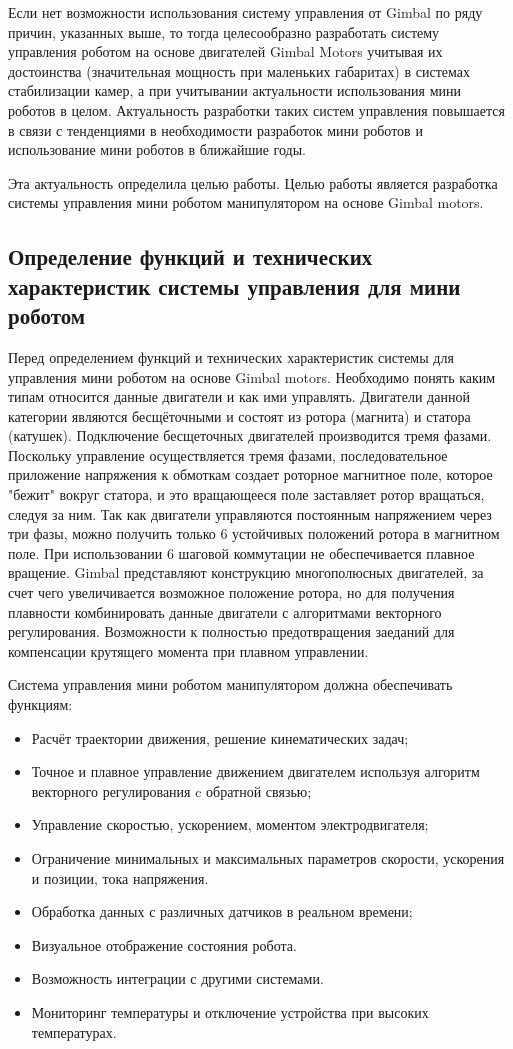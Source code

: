 Если нет возможности использования систему управления от Gimbal по ряду причин, указанных выше, то тогда целесообразно разработать систему управления роботом на основе двигателей Gimbal Motors учитывая их достоинства (значительная мощность при маленьких габаритах) в системах стабилизации камер, а при учитывании актуальности использования мини роботов в целом. Актуальность разработки таких систем управления повышается в связи с тенденциями в необходимости разработок мини роботов и использование мини роботов в ближайшие годы.

Эта актуальность определила целью работы. Целью работы является разработка системы управления мини роботом манипулятором на основе Gimbal motors.

\subsection{Определение функций и технических характеристик системы управления для мини роботом}

Перед определением функций и технических характеристик системы для управления мини роботом на основе Gimbal motors. Необходимо понять каким типам относится данные двигатели и как ими управлять.  Двигатели данной категории являются бесщёточными и состоят из ротора (магнита) и статора (катушек). Подключение бесщеточных двигателей производится тремя фазами. Поскольку управление осуществляется тремя фазами, последовательное приложение напряжения к обмоткам создает роторное магнитное поле, которое "бежит" вокруг статора, и это вращающееся поле заставляет ротор вращаться, следуя за ним.  Так как двигатели управляются постоянным напряжением через три фазы, можно получить только 6 устойчивых положений ротора в магнитном поле. При использовании 6 шаговой коммутации не обеспечивается плавное вращение. Gimbal представляют конструкцию многополюсных двигателей, за счет чего увеличивается возможное положение ротора, но для получения плавности комбинировать данные двигатели с алгоритмами векторного регулирования. Возможности к полностью предотвращения заеданий для компенсации крутящего момента при плавном управлении.

Система управления мини роботом манипулятором должна обеспечивать функциям:
\begin{itemize}
	\item Расчёт траектории движения, решение кинематических задач;
	\item Точное и плавное управление движением двигателем используя алгоритм векторного регулирования c обратной связью;
	\item Управление скоростью, ускорением, моментом электродвигателя;
	\item Ограничение минимальных и максимальных параметров скорости, ускорения и позиции, тока напряжения.
	\item Обработка данных с различных датчиков в реальном времени;
	\item Визуальное отображение состояния робота.
	\item Возможность интеграции с другими системами.
	\item Мониторинг температуры и отключение устройства при высоких температурах.
\end{itemize}

